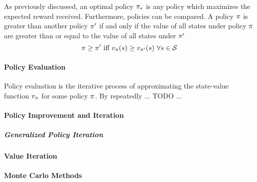 As previously discussed,
an optimal policy $\pi_*$ is any policy which maximizes the expected reward
received.
%
Furthermore, policies can be compared.
%
A policy $\pi$ is greater than another policy $\pi'$
if and only if the value of all states under policy $\pi$
are greater than or equal to the value of all states under $\pi'$
\[
\policy \ge \policy'\ 
	\text{iff}\ 
	v_\policy(s) \ge v_{\policy'}(s)\ \forall s\in\States
\]


\paragraph*{Policy Evaluation}


Policy evaluation is the iterative process of approximating the state-value
function $v_\pi$ for some policy $\pi$.
%
By repeatedly ... TODO ...



\paragraph*{Policy Improvement and Iteration}



% 

	\subparagraph*{Generalized Policy Iteration}


\paragraph*{Value Iteration}




\paragraph*{Monte Carlo Methods}



